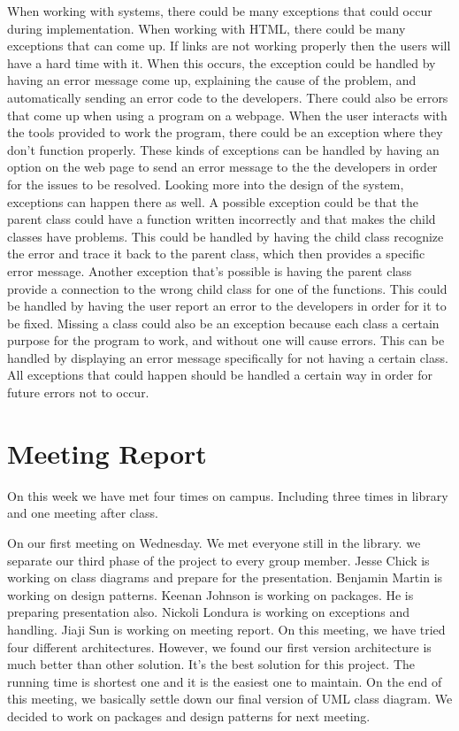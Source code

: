 \documentclass[12pt]{article}
\begin{document}
\par
When working with systems, there could be many exceptions that could occur during implementation. When working with HTML, there could be many exceptions that can come up. If links are not working properly then the users will have a hard time with it. When this occurs, the exception could be handled by having an error message come up, explaining the cause of the problem, and automatically sending an error code to the developers. There could also be errors that come up when using a program on a webpage. When the user interacts with the tools provided to work the program, there could be an exception where they don’t function properly. These kinds of exceptions can be handled by having an option on the web page to send an error message to the the developers in order for the issues to be resolved. Looking more into the design of the system, exceptions can happen there as well. A possible exception could be that the parent class could have a function written incorrectly and that makes the child classes have problems. This could be handled by having the child class recognize the error and trace it back to the parent class, which then provides a specific error message. Another exception that's possible is having the parent class provide a connection to the wrong child class for one of the functions. This could be handled by having the user report an error to the developers in order for it to be fixed. Missing a class could also be an exception because each class a certain purpose for the program to work, and without one will cause errors. This can be handled by displaying an error message specifically for not having a certain class. All exceptions that could happen should be handled a certain way in order for future errors not to occur. \\

\section{Meeting Report}
\par
On this week we have met four times on campus. Including three times in library and one meeting after class. \\

\par
On our first meeting on Wednesday. We met everyone still in the library. we separate our third phase of the project to every group member. Jesse Chick is working on class diagrams and prepare for the presentation. Benjamin Martin is working on design patterns. Keenan Johnson is working on packages. He is preparing presentation also. Nickoli Londura is working on exceptions and handling. Jiaji Sun is working on meeting report. On this meeting, we have tried four different architectures. However, we found our first version architecture is much better than other solution. It’s the best solution for this project. The running time is shortest one and it is the easiest one to maintain. On the end of this meeting, we basically settle down our final version of UML class diagram. We decided to work on packages and design patterns for next meeting. \\
\end{document}
